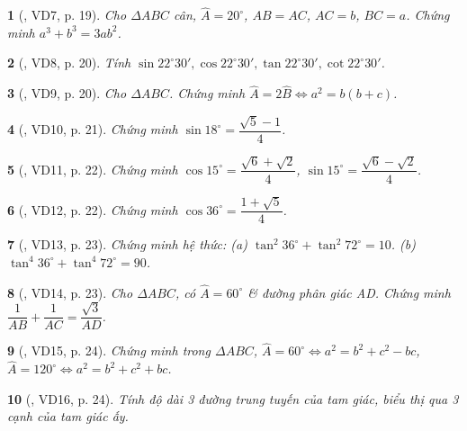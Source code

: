 \documentclass{article}
\newtheorem{baitoan}{}
\begin{document}
\begin{baitoan}[\cite{Kien_hinh_hoc_9}, VD7, p. 19]
	Cho $\Delta ABC$ cân, $\widehat{A} = 20^\circ$, $AB = AC$, $AC = b$, $BC = a$. Chứng minh $a^3 + b^3 = 3ab^2$.
\end{baitoan}

\begin{baitoan}[\cite{Kien_hinh_hoc_9}, VD8, p. 20]
	Tính $\sin22^\circ30',\cos22^\circ30',\tan22^\circ30',\cot22^\circ30'$.
\end{baitoan}

\begin{baitoan}[\cite{Kien_hinh_hoc_9}, VD9, p. 20]
	Cho $\Delta ABC$. Chứng minh $
	\widehat{A} = 2\widehat{B}\Leftrightarrow a^2 = b(b + c)$.
\end{baitoan}

\begin{baitoan}[\cite{Kien_hinh_hoc_9}, VD10, p. 21]
	Chứng minh $\sin18^\circ = \dfrac{\sqrt{5} - 1}{4}$.
\end{baitoan}

\begin{baitoan}[\cite{Kien_hinh_hoc_9}, VD11, p. 22]
	Chứng minh $\cos15^\circ = \dfrac{\sqrt{6} + \sqrt{2}}{4}$, $\sin15^\circ = \dfrac{\sqrt{6} - \sqrt{2}}{4}$.
\end{baitoan}

\begin{baitoan}[\cite{Kien_hinh_hoc_9}, VD12, p. 22]
	Chứng minh $\cos36^\circ = \dfrac{1 + \sqrt{5}}{4}$.	
\end{baitoan}

\begin{baitoan}[\cite{Kien_hinh_hoc_9}, VD13, p. 23]
	Chứng minh hệ thức: (a) $\tan^2 36^\circ + \tan^2 72^\circ = 10$. (b) $\tan^4 36^\circ + \tan^4 72^\circ = 90$.
\end{baitoan}

\begin{baitoan}[\cite{Kien_hinh_hoc_9}, VD14, p. 23]
	Cho $\Delta ABC$, có $\widehat{A} = 60^\circ$ \& đường phân giác AD. Chứng minh $\dfrac{1}{AB} + \dfrac{1}{AC} = \dfrac{\sqrt{3}}{AD}$.
\end{baitoan}

\begin{baitoan}[\cite{Kien_hinh_hoc_9}, VD15, p. 24]
	Chứng minh trong $\Delta ABC$, $\widehat{A} = 60^\circ\Leftrightarrow a^2 = b^2 + c^2 - bc$, $\widehat{A} = 120^\circ\Leftrightarrow a^2 = b^2 + c^2 + bc$.
\end{baitoan}

\begin{baitoan}[\cite{Kien_hinh_hoc_9}, VD16, p. 24]
	Tính độ dài 3 đường trung tuyến của tam giác, biểu thị qua 3 cạnh của tam giác ấy.
\end{baitoan}
\end{document}
